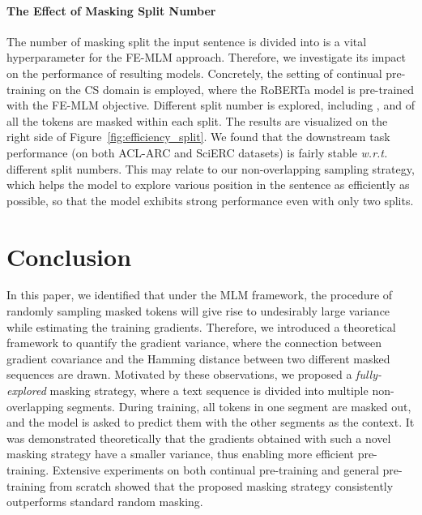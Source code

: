\documentclass{article} \usepackage{iclr2021_conference,times}
\theoremstyle{plain}
\begin{document}
\paragraph{The Effect of Masking Split Number} The number of masking split the input sentence is divided into is a vital hyperparameter for the FE-MLM approach. Therefore, we investigate its impact on the performance of resulting models. Concretely, the setting of continual pre-training on the CS domain is employed, where the RoBERTa model is pre-trained with the  FE-MLM objective. Different split number is explored, including , and  of all the tokens are masked within each split. The results are visualized on the right side of Figure~\ref{fig:efficiency_split}. We found that the downstream task performance (on both ACL-ARC and SciERC datasets) is fairly stable \emph{w.r.t.} different split numbers. This may relate to our non-overlapping sampling strategy, which helps the model to explore various position in the sentence as efficiently as possible, so that the model exhibits strong performance even with only two splits.
\vspace{-4mm}
\section{Conclusion}
\vspace{-3mm}
In this paper, we identified that under the MLM framework, the procedure of randomly sampling masked tokens will give rise to undesirably large variance while estimating the training gradients.
Therefore, we introduced a theoretical framework to quantify the gradient variance, where the connection between gradient covariance and the Hamming distance between two different masked sequences are drawn.
Motivated by these observations, we proposed a \emph{fully-explored} masking strategy, where a text sequence is divided into multiple non-overlapping segments. During training, all tokens in one segment are masked out, and the model is asked to predict them with the other segments as the context. 
It was demonstrated theoretically that the gradients obtained with such a novel masking strategy have a smaller variance, thus enabling more efficient pre-training. 
Extensive experiments on both continual pre-training and general pre-training from scratch showed that the proposed masking strategy consistently outperforms standard random masking.
\end{document}
